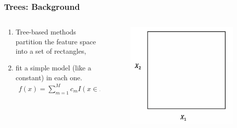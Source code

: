 \documentclass[
  shownotes,
  xcolor={svgnames},
  hyperref={colorlinks,citecolor=DarkBlue,linkcolor=DarkRed,urlcolor=DarkBlue}
  , aspectratio=169]{beamer}
\begin{document}
\begin{frame}[fragile]
\frametitle{Trees: Background}


\begin{columns}[T] %
\begin{column}{.42\textwidth}
  
\begin{enumerate}
\item Tree-based methods partition the feature space into a set of rectangles,
\item  fit a simple model (like a constant) in each one. 
\begin{align}
f(x) = \sum_{m=1}^M c_m I(x\in R_m)
\end{align}
\end{enumerate}


\end{column}  
\hfill
\begin{column}{.48\textwidth}

 \begin{figure}[H] \centering
            \captionsetup{justification=centering}
              \includegraphics[scale=0.4]{figures/cart_1}                           
 \end{figure}

\end{column}
\end{columns}

\end{frame}
\end{document}

